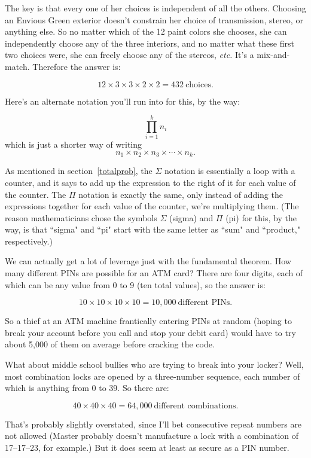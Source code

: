 The key is that every one of her choices is independent of all the others.
Choosing an Envious Green exterior doesn't constrain her choice of
transmission, stereo, or anything else. So no matter which of the 12 paint
colors she chooses, she can independently choose any of the three
interiors, and no matter what these first two choices were, she can freely
choose any of the stereos, \textit{etc.} It's a mix-and-match. Therefore
the answer is:

\[
12 \times 3 \times 3 \times 2 \times 2 = 432\ \text{choices}.
\]

Here's an alternate notation you'll run into for this, by the way:

\[
\prod_{i=1}^k{n_i}
\]
which is just a shorter way of writing
\[
n_1 \times n_2 \times n_3 \times \cdots \times n_k.
\]

As mentioned in section~\ref{totalprob}, the $\Sigma$ notation is
essentially a loop with a counter, and it says to add up the expression to
the right of it for each value of the counter. The $\Pi$ notation is
exactly the same, only instead of adding the expressions together for each
value of the counter, we're multiplying them. (The reason mathematicians
chose the symbols $\Sigma$ (sigma) and $\Pi$ (pi) for this, by the way, is
that ``sigma" and ``pi" start with the same letter as ``sum" and
``product," respectively.)

We can actually get a lot of leverage just with the fundamental theorem.
How many different PINs are possible for an ATM card? There are four
digits, each of which can be any value from 0 to 9 (ten total values), so
the answer is:

\[
10 \times 10 \times 10 \times 10 = 10,000\ \text{different PINs}.
\]

So a thief at an ATM machine frantically entering PINs at random (hoping to
break your account before you call and stop your debit card) would have to
try about 5,000 of them on average before cracking the code.

What about middle school bullies who are trying to break into your locker?
Well, most combination locks are opened by a three-number sequence, each
number of which is anything from 0 to 39. So there are:

\[
40 \times 40 \times 40 = 64,000\ \text{different combinations}.
\]

That's probably slightly overstated, since I'll bet consecutive repeat
numbers are not allowed (Master probably doesn't manufacture a lock with a
combination of 17--17--23, for example.) But it does seem at least as
secure as a PIN number.

